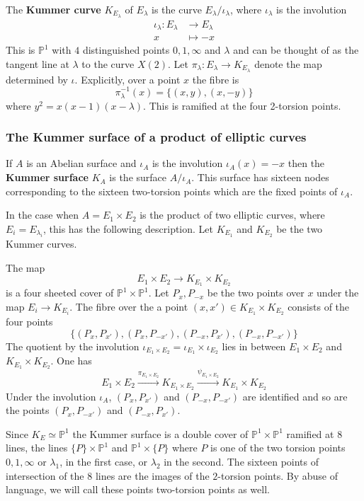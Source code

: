 \documentclass[11pt,a4paper]{article}
\newcommand {\LA}{{\lambda}}
\newcommand {\CP}{{\mathds P}}
\newcommand {\io}{{\iota}}
\newcommand {\lb}{{\lambda}}
\begin{document}
The {\bf Kummer curve} $K_{E_{\LA}}$ of $E_{\LA}$ is the curve $E_{\LA}/\iota_{\LA}$, where $\iota_{\LA}$ is the involution \begin{align*}
\iota_{\LA}:E_{\LA} &\longrightarrow E_{\LA}\\
x &\mapsto -x
\end{align*}
 This is $\CP^1$ with $4$ distinguished points $0,1,\infty$ and $\lambda$  and can be thought of as the tangent line at $\LA$ to the curve $X(2)$. Let $\pi_{\lambda}:E_{\lambda} \rightarrow K_{E_{\lambda}}$ denote the map determined by $\iota$. Explicitly, over a point $x$ the fibre is 
 $$\pi^{-1}_{\lb}(x)=\{(x,y),(x,-y)\}$$
 where $y^2=x(x-1)(x-\lb)$. This is ramified at the four 2-torsion points. 
 

 
\subsubsection{The Kummer surface of a product of elliptic curves}\label{sssec-km-surface-prod-ell-curves}

If $A$ is an Abelian surface  and $\io_A$ is the involution $\io_A(x)=-x$ then the {\bf Kummer surface} $K_A$ is the surface $A/\io_A$. This surface has sixteen nodes corresponding to the sixteen two-torsion points which are the fixed points of $\io_A$. 
 
In the case when $A=E_1 \times E_2$ is the product of two elliptic curves, where $E_i=E_{\lb_i}$, this has the following description. Let $K_{E_1}$ and $K_{E_2}$ be the two Kummer curves. 

The map 
%
$$E_1 \times E_2 \longrightarrow K_{E_1} \times K_{E_2}$$
%
is a four sheeted cover of $\CP^1 \times \CP^1$. Let $P_x,P_{-x}$ be the two points over $x$ under the map $E_i \rightarrow K_{E_i}$. The fibre over the a point $(x,x') \in  K_{E_1} \times K_{E_2}$ consists of the four points 
%
$$\{(P_x,P_{x'}), (P_x,P_{-x'}), (P_{-x},P_{x'}), (P_{-x},P_{-x'})\}$$
%
The quotient by the involution $\io_{E_1 \times E_2}=\io_{E_1} \times \io_{E_2}$ lies in between  $E_1 \times E_2$ and  $K_{E_1} \times K_{E_2}$. One has 
%
$$E_1 \times E_2 \stackrel{\pi_{E_1 \times E_2}}{\longrightarrow} K_{E_1 \times E_2} \stackrel {\psi_{E_1 \times E_2}}{\longrightarrow} K_{E_1} \times K_{E_2}$$
%
Under the involution $\io_A$, $(P_x,P_{x'})$ and $(P_{-x},P_{-x'})$ are identified and so are the points $(P_x,P_{-x'})$ and $(P_{-x},P_{x'})$. 

Since $K_E  \simeq \CP^1$ the Kummer surface is a double cover of $\CP^1 \times \CP^1$ ramified at 8 lines, the lines $\{P\} \times \CP^1$ and $\CP^1 \times \{P\}$ where $P$ is one of the two torsion points $0,1,\infty$ or $\lb_1$,  in the first case, or $\lb_2$ in the second. The sixteen points of intersection of the 8 lines are the images of the $2$-torsion points. By abuse of language, we will call these points two-torsion points as well. 
\end{document}
